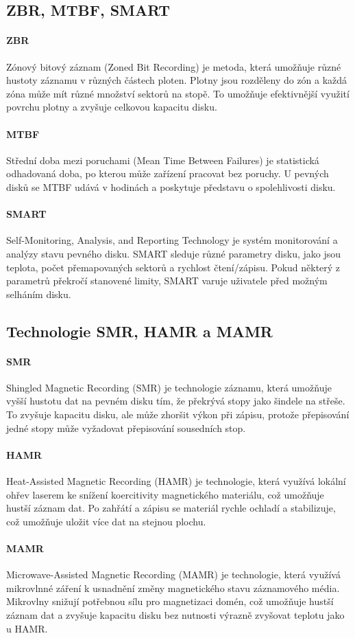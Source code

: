 \subsection{ZBR, MTBF, SMART}
\paragraph{ZBR}
Zónový bitový záznam (Zoned Bit Recording) je metoda, která umožňuje různé hustoty záznamu v různých částech ploten. Plotny jsou rozděleny do zón a každá zóna může mít různé množství sektorů na stopě. To umožňuje efektivnější využití povrchu plotny a zvyšuje celkovou kapacitu disku.

\paragraph{MTBF}
Střední doba mezi poruchami (Mean Time Between Failures) je statistická odhadovaná doba, po kterou může zařízení pracovat bez poruchy. U pevných disků se MTBF udává v hodinách a poskytuje představu o spolehlivosti disku.

\paragraph{SMART}
Self-Monitoring, Analysis, and Reporting Technology je systém monitorování a analýzy stavu pevného disku. SMART sleduje různé parametry disku, jako jsou teplota, počet přemapovaných sektorů a rychlost čtení/zápisu. Pokud některý z parametrů překročí stanovené limity, SMART varuje uživatele před možným selháním disku.

\subsection{Technologie SMR, HAMR a MAMR}
\paragraph{SMR}
Shingled Magnetic Recording (SMR) je technologie záznamu, která umožňuje vyšší hustotu dat na pevném disku tím, že překrývá stopy jako šindele na střeše. To zvyšuje kapacitu disku, ale může zhoršit výkon při zápisu, protože přepisování jedné stopy může vyžadovat přepisování sousedních stop.

\paragraph{HAMR}
Heat-Assisted Magnetic Recording (HAMR) je technologie, která využívá lokální ohřev laserem ke snížení koercitivity magnetického materiálu, což umožňuje hustší záznam dat. Po zahřátí a zápisu se materiál rychle ochladí a stabilizuje, což umožňuje uložit více dat na stejnou plochu.

\paragraph{MAMR}
Microwave-Assisted Magnetic Recording (MAMR) je technologie, která využívá mikrovlnné záření k usnadnění změny magnetického stavu záznamového média. Mikrovlny snižují potřebnou sílu pro magnetizaci domén, což umožňuje hustší záznam dat a zvyšuje kapacitu disku bez nutnosti výrazně zvyšovat teplotu jako u HAMR.
